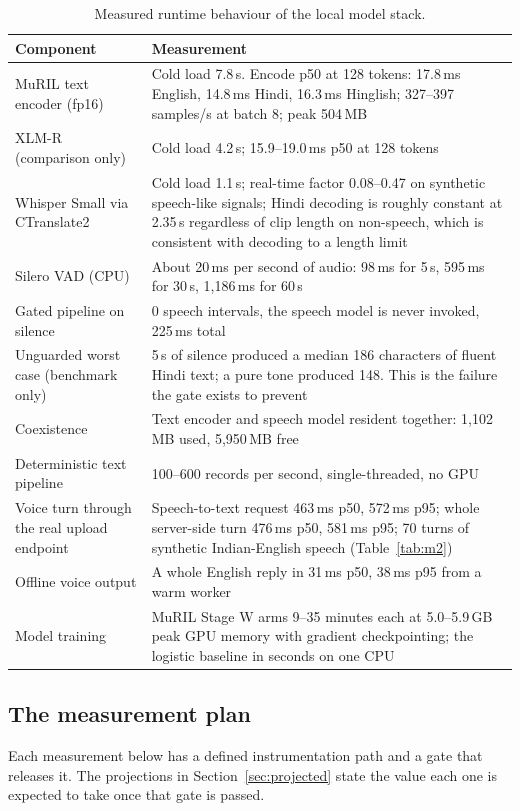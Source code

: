 \documentclass[11pt,a4paper]{article}
\begin{document}
\begin{table}[!htbp]
\centering\footnotesize
\caption{Measured runtime behaviour of the local model stack.}
\label{tab:perf}
\begin{tabularx}{\linewidth}{@{}>{\raggedright\arraybackslash}p{3.4cm}X@{}}
\toprule
Component & Measurement \\
\midrule
MuRIL text encoder (fp16) & Cold load 7.8\,s. Encode p50 at 128 tokens: 17.8\,ms English, 14.8\,ms
Hindi, 16.3\,ms Hinglish; 327--397 samples/s at batch 8; peak 504\,MB \\
XLM-R (comparison only) & Cold load 4.2\,s; 15.9--19.0\,ms p50 at 128 tokens \\
Whisper Small via CTranslate2 & Cold load 1.1\,s; real-time factor 0.08--0.47 on synthetic
speech-like signals; Hindi decoding is roughly constant at 2.35\,s regardless of clip length on
non-speech, which is consistent with decoding to a length limit \\
Silero VAD (CPU) & About 20\,ms per second of audio: 98\,ms for 5\,s, 595\,ms for 30\,s, 1{,}186\,ms
for 60\,s \\
Gated pipeline on silence & 0 speech intervals, the speech model is never invoked, 225\,ms total \\
Unguarded worst case (benchmark only) & 5\,s of silence produced a median 186 characters of fluent
Hindi text; a pure tone produced 148. This is the failure the gate exists to prevent \\
Coexistence & Text encoder and speech model resident together: 1{,}102\,MB used, 5{,}950\,MB free \\
Deterministic text pipeline & 100--600 records per second, single-threaded, no GPU \\
Voice turn through the real upload endpoint & Speech-to-text request 463\,ms p50, 572\,ms p95; whole
server-side turn 476\,ms p50, 581\,ms p95; 70 turns of synthetic Indian-English speech
(Table~\ref{tab:m2}) \\
Offline voice output & A whole English reply in 31\,ms p50, 38\,ms p95 from a warm worker \\
Model training & MuRIL Stage W arms 9--35 minutes each at 5.0--5.9\,GB peak GPU memory with gradient
checkpointing; the logistic baseline in seconds on one CPU \\
\bottomrule
\end{tabularx}
\end{table}

\subsection{The measurement plan}
\label{sec:notmeasured}
Each measurement below has a defined instrumentation path and a gate that releases it. The
projections in Section~\ref{sec:projected} state the value each one is expected to take once that
gate is passed.
\end{document}
